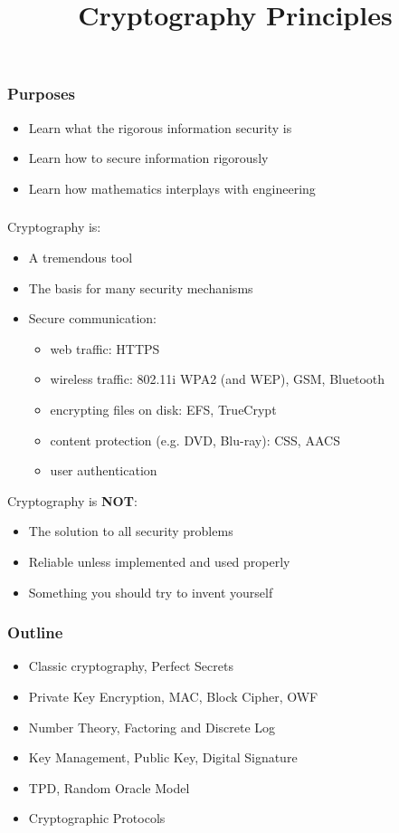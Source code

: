 

\title{Cryptography Principles}


\maketitle
\begin{frame}\frametitle{Purposes}
\begin{itemize}
\item Learn what the rigorous information security is
\item Learn how to secure information rigorously
\item Learn how mathematics interplays with engineering
\end{itemize}
\end{frame}
\begin{frame}\frametitle{}
Cryptography is:
\begin{itemize}
\item A tremendous tool
\item The basis for many security mechanisms
\item Secure communication: 
\begin{itemize}
\item web traffic: HTTPS
\item wireless traffic: 802.11i WPA2 (and WEP), GSM, Bluetooth
\item encrypting files on disk: EFS, TrueCrypt
\item content protection (e.g. DVD, Blu-ray): CSS, AACS
\item user authentication
\end{itemize}
\end{itemize}
Cryptography is \textbf{NOT}:
\begin{itemize}
\item The solution to all security problems
\item Reliable unless implemented and used properly
\item Something you should try to invent yourself	
\end{itemize}
\end{frame}
\begin{frame}\frametitle{Outline}
\begin{itemize}
\item Classic cryptography, Perfect Secrets
\item Private Key Encryption, MAC, Block Cipher, OWF
\item Number Theory, Factoring and Discrete Log
\item Key Management, Public Key, Digital Signature
\item TPD, Random Oracle Model
\item Cryptographic Protocols
\end{itemize}	
\end{frame}

